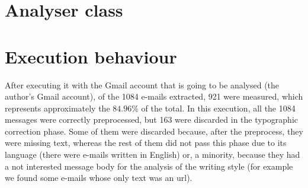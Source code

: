 \section{Analyser class}\label{sect:analyserclass}


\section{Execution behaviour} \label{section:exebehav}
After executing it with the Gmail account that is going to be analysed (the author's Gmail account), of the 1084 e-mails extracted, 921 were measured, which represents approximately the $84.96$\% of the total. In this execution, all the 1084 messages were correctly preprocessed, but 163 were discarded in the typographic correction phase. Some of them were discarded because, after the preprocess, they were missing text, whereas the rest of them did not pass this phase due to its language (there were e-mails written in English) or, a minority, because they had a not interested message body for the analysis of the writing style (for example we found some e-mails whose only text was an url).